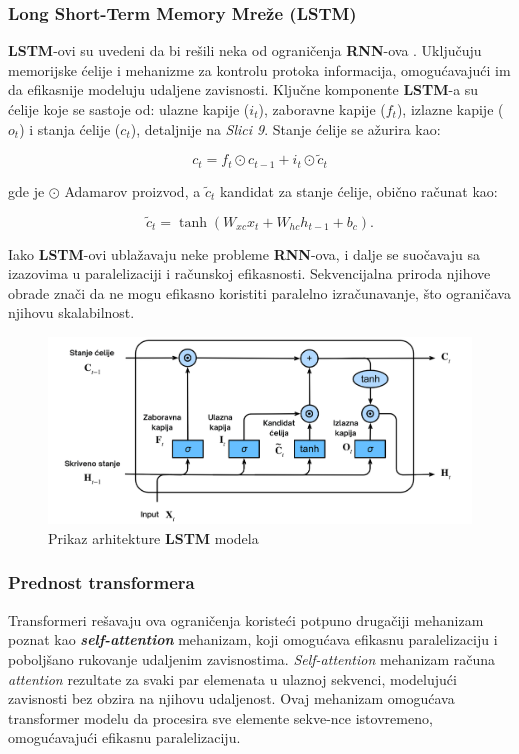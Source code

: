 \documentclass[12pt]{article}
\begin{document}
   \subsubsection{Long Short-Term Memory Mreže (LSTM)}
   \textbf{LSTM}-ovi su uvedeni da bi rešili neka od ograničenja \textbf{RNN}-ova \cite{lstms_explained0}. 
   Uključuju memorijske ćelije i mehanizme za kontrolu protoka informacija, 
   omogućavajući im da efikasnije modeluju udaljene zavisnosti. Ključne komponente \textbf{LSTM}-a su ćelije 
   koje se sastoje od: ulazne kapije (\( i_t \)), zaboravne kapije (\( f_t \)), izlazne kapije (\( o_t \)) i 
   stanja ćelije (\( c_t \)), detaljnije na \textit{Slici 9}. Stanje ćelije se ažurira kao:

   \[ c_t = f_t \odot c_{t-1} + i_t \odot \tilde{c}_t \]

   gde je $\odot$ Adamarov proizvod, a \( \tilde{c}_t \) kandidat za stanje ćelije, obično računat kao:

   \[ \tilde{c}_t = \tanh(W_{xc} x_t + W_{hc} h_{t-1} + b_c). \]

   Iako \textbf{LSTM}-ovi ublažavaju neke probleme \textbf{RNN}-ova, i dalje se suočavaju sa 
   izazovima u paralelizaciji i računskoj efikasnosti. Sekvencijalna priroda njihove
   obrade znači da ne mogu efikasno koristiti paralelno izračunavanje, što ograničava njihovu 
   skalabilnost.

   \begin{figure}[h!]
      \centering
      \vspace{1.5cm} %
      \includegraphics[width=1\textwidth]{lstm.png}
      \caption{Prikaz arhitekture \textbf{LSTM} modela \cite{lstms_explained}}
      \label{fig:lstm}
   \end{figure}

   \subsubsection{Prednost transformera}
   Transformeri rešavaju ova ograničenja koristeći potpuno drugačiji mehanizam poznat kao 
   \textbf{\textit{self-attention}} mehanizam, koji omogućava efikasnu paralelizaciju i poboljšano 
   rukovanje udaljenim zavisnostima. \textit{Self-attention} mehanizam računa \textit{attention} 
   rezultate za svaki par elemenata u ulaznoj sekvenci, modelujući zavisnosti bez obzira na njihovu
   udaljenost. Ovaj mehanizam omogućava transformer modelu da procesira sve elemente 
   sekve-nce istovremeno, omogućavajući efikasnu paralelizaciju. 
   
\end{document}
